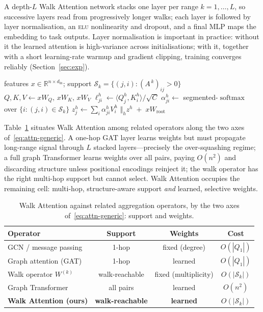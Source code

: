\documentclass[runningheads]{llncs}
\newcommand{\RR}{\mathbb{R}}
\newcommand{\Adj}{A}
\DeclareMathOperator{\softmax}{softmax}
\begin{document}
A depth-$L$ Walk Attention network stacks one layer per range $k=1,\dots,L$, so
successive layers read from progressively longer walks; each layer is followed
by layer normalisation, an \textsc{elu} nonlinearity and dropout, and a final
MLP maps the embedding to task outputs. Layer normalisation is important in
practice: without it the learned attention is high-variance across
initialisations; with it, together with a short learning-rate warmup and
gradient clipping, training converges reliably (Section~\ref{sec:exp}).

\begin{algorithm}[t]
\caption{Walk Attention layer at range $k$ (sparse).}\label{alg:wa}
\begin{algorithmic}[1]
\Require features $x\in\RR^{n\times d_{\text{in}}}$; support
  $\mathcal{S}_k=\{(j,i):(\Adj^{\,k})_{ij}>0\}$
\State $Q,K,V \gets xW_Q,\,xW_K,\,xW_V$ 
  \State $\ell^h_{ji}\gets \langle Q^h_j,K^h_i\rangle/\sqrt{C}$
\EndFor
\State $\alpha^h_{ji}\gets$ segmented-$\softmax$ over $\{i:(j,i)\in\mathcal{S}_k\}$
\State $z^h_j\gets \sum_i \alpha^h_{ji}V^h_i$ 
\State \Return $\bigl\Vert_h z^h \;+\; xW_{\!\text{root}}$
\end{algorithmic}
\end{algorithm}

Table~\ref{tab:relation} situates Walk Attention among related operators along
the two axes of~\eqref{eq:attn-generic}. A one-hop GAT layer learns weights but
must propagate long-range signal through $L$ stacked layers---precisely the
over-squashing regime; a full graph Transformer learns weights over all pairs,
paying $O(n^2)$ and discarding structure unless positional encodings reinject
it; the walk operator has the right multi-hop support but cannot select. Walk
Attention occupies the remaining cell: multi-hop, structure-aware support
\emph{and} learned, selective weights.

\begin{table}[t]
\centering
\caption{Walk Attention against related aggregation operators, by the two axes
of~\eqref{eq:attn-generic}: support and weights.}
\label{tab:relation}
\begin{tabular}{lccc}
\toprule
\textbf{Operator} & \textbf{Support} & \textbf{Weights} & \textbf{Cost} \\
\midrule
GCN / message passing       & 1-hop      & fixed (degree) & $O(|Q_1|)$ \\
Graph attention (GAT)       & 1-hop      & learned        & $O(|Q_1|)$ \\
Walk operator $W^{(k)}$     & walk-reachable & fixed (multiplicity) & $O(|\mathcal{S}_k|)$ \\
Graph Transformer           & all pairs  & learned        & $O(n^2)$ \\
\textbf{Walk Attention (ours)} & \textbf{walk-reachable} & \textbf{learned} & $O(|\mathcal{S}_k|)$ \\
\bottomrule
\end{tabular}
\end{table}
\end{document}
